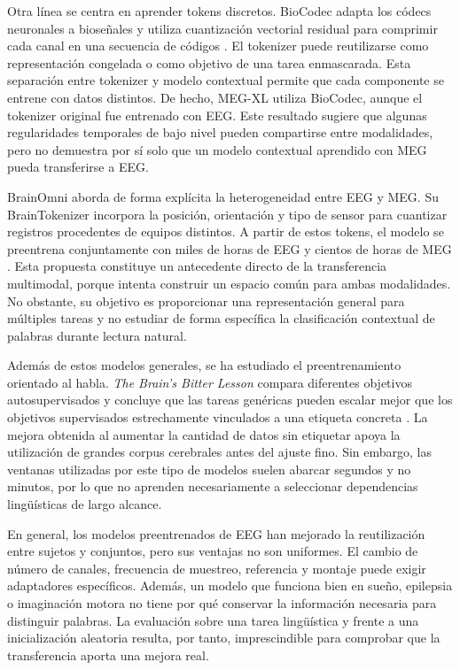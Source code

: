 Otra línea se centra en aprender tokens discretos. BioCodec adapta los códecs neuronales a bioseñales y utiliza cuantización vectorial residual para comprimir cada canal en una secuencia de códigos \cite{avramidis2025biocodec}. El tokenizer puede reutilizarse como representación congelada o como objetivo de una tarea enmascarada. Esta separación entre tokenizer y modelo contextual permite que cada componente se entrene con datos distintos. De hecho, MEG-XL utiliza BioCodec, aunque el tokenizer original fue entrenado con EEG. Este resultado sugiere que algunas regularidades temporales de bajo nivel pueden compartirse entre modalidades, pero no demuestra por sí solo que un modelo contextual aprendido con MEG pueda transferirse a EEG.

BrainOmni aborda de forma explícita la heterogeneidad entre EEG y MEG. Su BrainTokenizer incorpora la posición, orientación y tipo de sensor para cuantizar registros procedentes de equipos distintos. A partir de estos tokens, el modelo se preentrena conjuntamente con miles de horas de EEG y cientos de horas de MEG \cite{xiao2025brainomni}. Esta propuesta constituye un antecedente directo de la transferencia multimodal, porque intenta construir un espacio común para ambas modalidades. No obstante, su objetivo es proporcionar una representación general para múltiples tareas y no estudiar de forma específica la clasificación contextual de palabras durante lectura natural.

Además de estos modelos generales, se ha estudiado el preentrenamiento orientado al habla. \textit{The Brain's Bitter Lesson} compara diferentes objetivos autosupervisados y concluye que las tareas genéricas pueden escalar mejor que los objetivos supervisados estrechamente vinculados a una etiqueta concreta \cite{jayalath2025bitter}. La mejora obtenida al aumentar la cantidad de datos sin etiquetar apoya la utilización de grandes corpus cerebrales antes del ajuste fino. Sin embargo, las ventanas utilizadas por este tipo de modelos suelen abarcar segundos y no minutos, por lo que no aprenden necesariamente a seleccionar dependencias lingüísticas de largo alcance.

En general, los modelos preentrenados de EEG han mejorado la reutilización entre sujetos y conjuntos, pero sus ventajas no son uniformes. El cambio de número de canales, frecuencia de muestreo, referencia y montaje puede exigir adaptadores específicos. Además, un modelo que funciona bien en sueño, epilepsia o imaginación motora no tiene por qué conservar la información necesaria para distinguir palabras. La evaluación sobre una tarea lingüística y frente a una inicialización aleatoria resulta, por tanto, imprescindible para comprobar que la transferencia aporta una mejora real.

